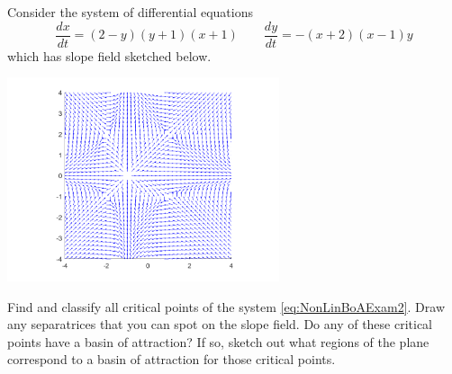 \documentclass{ximera}
\begin{document}
\begin{exercise} 
    Consider the system of differential equations
    \begin{equation}
        \frac{dx}{dt} = (2-y)(y+1)(x+1) \qquad \frac{dy}{dt} = -(x+2)(x-1)y \label{eq:NonLinBoAExam2}
    \end{equation}
    which has slope field sketched below.
    \begin{center}
        \includegraphics[width=0.6\textwidth]{figures/NLBoA_Ex2.png}
    \end{center}
    \begin{tasks}
        \task Find and classify all critical points of the system \eqref{eq:NonLinBoAExam2}.
        \task Draw any separatrices that you can spot on the slope field.
        \task Do any of these critical points have a basin of attraction? If so, sketch out what regions of the plane correspond to a basin of attraction for those critical points. 
    \end{tasks}
\end{exercise}
% 
\end{document}
